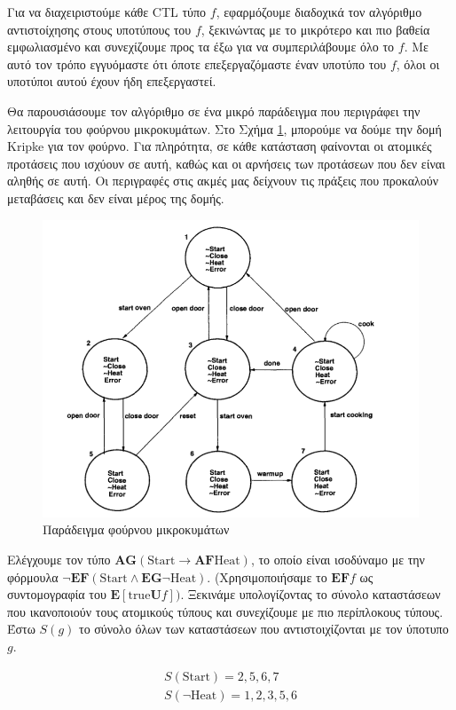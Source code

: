 \documentclass{article}
\newcommand{\english}[1]{\foreignlanguage{english}{{#1}}}
\begin{document}
Για να διαχειριστούμε κάθε \english{CTL} τύπο $f$, εφαρμόζουμε διαδοχικά τον αλγόριθμο αντιστοίχησης στους υποτύπους του $f$, ξεκινώντας με το μικρότερο και πιο βαθεία εμφωλιασμένο και συνεχίζουμε προς τα έξω για να συμπεριλάβουμε όλο το $f$. Με αυτό τον τρόπο εγγυόμαστε ότι όποτε επεξεργαζόμαστε έναν υποτύπο του $f$, όλοι οι υποτύποι αυτού έχουν ήδη επεξεργαστεί. 

Θα παρουσιάσουμε τον αλγόριθμο σε ένα μικρό παράδειγμα που περιγράφει την λειτουργία του φούρνου μικροκυμάτων. Στο Σχήμα \ref{fig:microwave}, μπορούμε να δούμε την δομή \english{Kripke} για τον φούρνο. Για πληρότητα, σε κάθε κατάσταση φαίνονται οι ατομικές προτάσεις που ισχύουν σε αυτή, καθώς και οι αρνήσεις των προτάσεων που δεν είναι αληθής σε αυτή. Οι περιγραφές στις ακμές μας δείχνουν τις πράξεις που προκαλούν μεταβάσεις και δεν είναι μέρος της δομής.

\begin{figure}
    \includegraphics[width=\textwidth]{microwave.png}
    \centering
    \caption{Παράδειγμα φούρνου μικροκυμάτων}
    \label{fig:microwave}
\end{figure}


Ελέγχουμε τον τύπο \english{$\mathbf{AG} (\text{Start} \rightarrow \mathbf{AF} \text{Heat})$}, το οποίο είναι ισοδύναμο με την φόρμουλα \english{$\neg \mathbf{EF} (\text{Start} \wedge \mathbf{EG} \neg \text{Heat})$}. (Χρησιμοποιήσαμε το $\mathbf{EF} f$ ως συντομογραφία του \english{$\mathbf{E}[\text{true} \mathbf{U} f])$}. Ξεκινάμε υπολογίζοντας το σύνολο καταστάσεων που ικανοποιούν τους ατομικούς τύπους και συνεχίζουμε με πιο περίπλοκους τύπους. Έστω $S(g)$ το σύνολο όλων των καταστάσεων που αντιστοιχίζονται με τον ύποτυπο $g$. 
\begin{otherlanguage}{english}
    \begin{align*}
        S(\text{Start}) = {2, 5, 6, 7}\\
        S(\neg \text{Heat}) = {1, 2, 3, 5, 6}
    \end{align*}
\end{otherlanguage}
\end{document}
